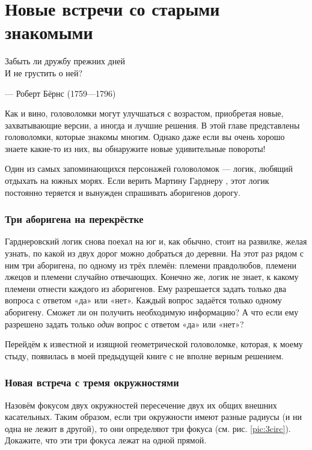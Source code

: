 \chapter{Новые встречи со старыми знакомыми}

\setlength{\epigraphwidth}{.53\textwidth}
\epigraph{Забыть ли дружбу прежних дней\\
И не грустить о ней?}{--- Роберт Бёрнс (1759---1796)}

Как и вино, головоломки могут улучшаться с возрастом, приобретая новые, захватывающие версии, а иногда и лучшие решения.
В этой главе представлены головоломки, которые знакомы многим.
Однако даже если вы очень хорошо знаете какие-то из них, 
вы обнаружите новые удивительные повороты!

Один из самых запоминающихся персонажей головоломок --- логик, любящий отдыхать на южных морях.
Если верить Мартину Гарднеру \cite{27}, этот логик постоянно теряется и вынужден спрашивать аборигенов дорогу.

\subsection*{Три аборигена на перекрёстке}

Гарднеровский логик снова поехал на юг и, как обычно, стоит на развилке, желая узнать, по какой из двух дорог можно добраться до деревни.
На этот раз рядом с ним три аборигена, по одному из трёх племён:
племени правдолюбов,
племени лжецов
и племени случайно отвечающих.
Конечно же, логик не знает, к какому племени отнести каждого из аборигенов.
Ему разрешается задать только два вопроса с ответом «да» или «нет».
Каждый вопрос задаётся только одному аборигену.
Сможет ли он получить необходимую информацию?
А что если ему разрешено задать только \emph{один} вопрос с ответом «да» или «нет»?

\medskip

Перейдём к известной и изящной геометрической головоломке, которая, к моему стыду, появилась в моей предыдущей книге \cite{59} с не вполне верным решением.

\subsection*{Новая встреча с тремя окружностями}

Назовём фокусом двух окружностей пересечение двух их общих внешних касательных.
Таким образом, если три окружности имеют разные радиусы (и ни одна не лежит в другой), то они определяют три фокуса (см. рис. \ref{pic:3circ}).
Докажите, что эти три фокуса лежат на одной прямой.

